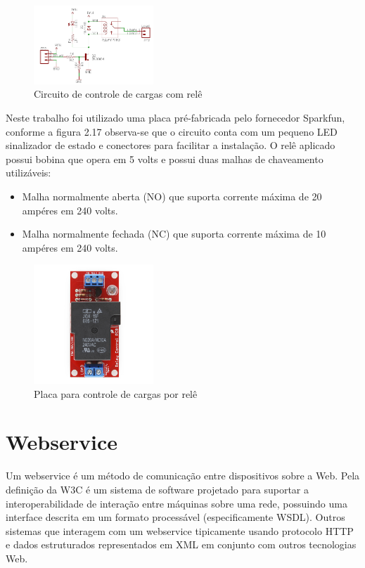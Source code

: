 \begin{figure}[h!]
			\centering
			\includegraphics[width=0.4\textwidth]{figures/circRele.png}
			\caption{Circuito de controle de cargas com relê}
			\label{1}
\end{figure}

Neste trabalho foi utilizado uma placa pré-fabricada pelo fornecedor Sparkfun, conforme a figura 2.17 observa-se que o circuito conta com um pequeno LED sinalizador de estado e conectores para facilitar a instalação. O relê aplicado possui bobina que opera em 5 volts e possui duas malhas de chaveamento utilizáveis:

\begin{itemize}
	\item Malha normalmente aberta (NO) que suporta corrente máxima de 20 ampéres em 240 volts.
	\item Malha normalmente fechada (NC) que suporta corrente máxima de 10 ampéres em 240 volts.
\end{itemize}

\begin{figure}[h!]
			\centering
			\includegraphics[width=0.4\textwidth]{figures/beefCake2.jpg}
			\caption{Placa para controle de cargas por relê}
			\label{1}
\end{figure}

\section{Webservice}

Um webservice é um método de comunicação entre dispositivos sobre a Web. Pela definição da W3C é um sistema de software projetado para suportar a interoperabilidade de interação entre máquinas sobre uma rede, possuindo uma interface descrita em um formato processável (especificamente WSDL). Outros sistemas que interagem com um webservice tipicamente usando protocolo HTTP e dados estruturados representados em XML em conjunto com outros tecnologias Web.

